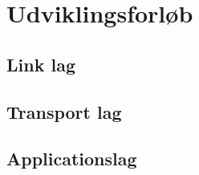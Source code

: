 \chapter{Udviklingsforløb}\label{ch:Udvikling}
\section{Link lag}

\section{Transport lag}

\section{Applicationslag}
